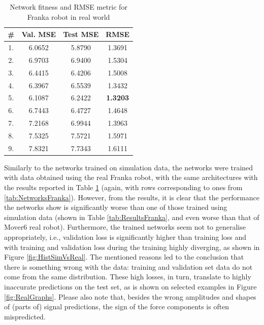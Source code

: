 \begin{table}
    \caption[Network fitness and RMSE metric for Franka robot (real world)]{Network fitness and RMSE metric for Franka robot in real world}
    \label{tab:ResultsFrankaReal}
    \centering
    \begin{tabular}{|c|c|c|c|}
        \hline
        \textbf{\#} & \textbf{Val. MSE} & \textbf{Test MSE} & \textbf{RMSE} \\
        \hline
        \hline
        1. & 6.0652 & 5.8790 & 1.3691 \\ %
        \hline
        2. & 6.9703 & 6.9400 & 1.5304   \\ %
        \hline
        3. & 6.4415 & 6.4206 & 1.5008 \\ %
        \hline
        4. & 6.3967 & 6.5539 & 1.3432 \\ %
        \hline
        5. & 6.1087 & 6.2422 & \textbf{1.3203} \\ %
        \hline
        6. & 6.7443 & 6.4727 & 1.4648 \\ %
        \hline
        7. & 7.2168 & 6.9944 & 1.3963 \\ %
        \hline
        8. & 7.5325 & 7.5721 & 1.5971 \\ %
        \hline
        9. & 7.8321 & 7.7343 & 1.6111 \\ %
        \hline
    \end{tabular}
\end{table}

Similarly to the networks trained on simulation data, the networks were trained with data obtained using the real Franka robot, with the same architectures with the results reported in Table \ref{tab:ResultsFrankaReal} (again, with rows corresponding to ones from \cref{tab:NetworksFranka}). However, from the results, it is clear that the performance the networks show is significantly worse than one of those trained using simulation data (shown in Table \ref{tab:ResultsFranka}, and even worse than that of Mover6 real robot). Furthermore, the trained networks seem not to generalise appropriately, i.e., validation loss is significantly higher than training loss and with training and validation loss during the training highly diverging, as shown in Figure \ref{fig:HistSimVsReal}. The mentioned reasons led to the conclusion that there is something wrong with the data: training and validation set data do not come from the same distribution. These high losses, in turn, translate to highly inaccurate predictions on the test set, as is shown on selected examples in Figure \ref{fig:RealGraphs}. Please also note that, besides the wrong amplitudes and shapes of (parts of) signal predictions, the sign of the force components is often mispredicted. 


